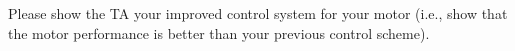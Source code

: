 \documentclass[openany,11pt,fleqn]{book} %
\begin{document}
%
%
%    
%    
%
%
%
%
%
%
\begin{assignment}
	Please show the TA your improved control system for your motor (i.e., show that the motor performance is better than your previous control scheme).
\end{assignment}
\end{document}
